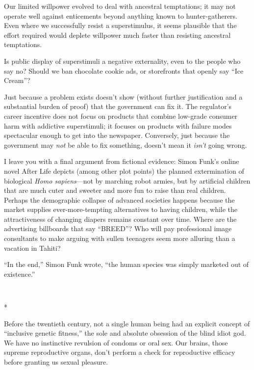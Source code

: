 {
 Our limited willpower evolved to deal with ancestral temptations;
it may not operate well against enticements beyond anything known to
hunter-gatherers. Even where we successfully resist a superstimulus, it
seems plausible that the effort required would deplete willpower much
faster than resisting ancestral temptations.}

{
 Is public display of superstimuli a negative externality, even to
the people who say no? Should we ban chocolate cookie ads, or
storefronts that openly say ``Ice
Cream''?}

{
 Just because a problem exists doesn't show
(without further justification and a substantial burden of proof) that
the government can fix it. The regulator's career
incentive does not focus on products that combine low-grade consumer
harm with addictive superstimuli; it focuses on products with failure
modes spectacular enough to get into the newspaper. Conversely, just
because the government may \textit{not} be able to fix something,
doesn't mean it \textit{isn't} going
wrong.}

{
 I leave you with a final argument from fictional evidence: Simon
Funk's online novel After Life depicts (among other
plot points) the planned extermination of biological \textit{Homo
sapiens}{}---not by marching robot armies, but by artificial children
that are much cuter and sweeter and more fun to raise than real
children. Perhaps the demographic collapse of advanced societies
happens because the market supplies ever-more-tempting alternatives to
having children, while the attractiveness of changing diapers remains
constant over time. Where are the advertising billboards that say
``BREED''? Who will pay professional
image consultants to make arguing with sullen teenagers seem more
alluring than a vacation in Tahiti?}

{
 ``In the end,'' Simon Funk
wrote, ``the human species was simply marketed out of
existence.''}

{\centering
 \ ~
\par}

{\centering
 *
\par}


{
 Before the twentieth century, not a single human being had an
explicit concept of ``inclusive genetic
fitness,'' the sole and absolute obsession of the
blind idiot god. We have no instinctive revulsion of condoms or oral
sex. Our brains, those supreme reproductive organs,
don't perform a check for reproductive efficacy before
granting us sexual pleasure. }


